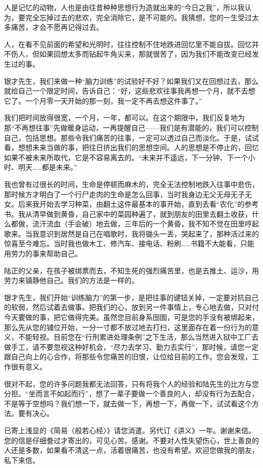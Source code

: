 \par {}
\par 人是记忆的动物，人也是由往昔种种思想行为造就出来的“今日之我”，所以我认为，要完全忘掉过去的悲欢，完全消除它，是不可能的。我猜想，您的一生受过太多痛苦，才会不愿再记得过去。
\par 人，在看不见前面的希望和光明时，往往控制不住地跌进回忆里不能自拔。回忆并不伤人，但如果回想太多而钻起牛角尖来，那就很苦了，因为我们不能改变已经发生过的事。
\par 银才先生，我们来做一种“脑力训练”的试验好不好？如果我们又在回想过去，那么就给自己一个限定时间，告诉自己：“好，这些悲欢往事我再想一个月，就不去想它了。一个月零一天开始的那一刻，我一定不再去想这件事了。”
\par 我们把时间放得很宽，一个月，一年，都可以。在这个期限中，我们反复地为那“不再想往事”先做暖身运动，一再提醒自己——我们是有潜能的，我们可以控制自己，包括思想。那些令我们痛苦的往事，一定可以透过自己而淡化。于是，试试看，想想未来当做的事，把往日挤出我们的思想空间。人的思想是不停止的，回忆如果不被未来所取代，它是不容易离去的。“未来并不遥远，下一分钟、下一个小时、明天……都是未来。”
\par 我也曾有过很长的时间，生命是停顿而麻木的，完全无法控制地跌入往事中悲伤，那时候方才明白了一个行尸走肉的生命是怎么回事，当时我身边无父无母无子无女。后来我开始去学习种菜，由翻土这件最基本的事开始，直到去看“农化”的参考书。我从清早做到黄昏，自己家中的菜园种遍了，就到朋友的田里去翻土收获，什么都做，流汗流血（手会破）地去做，三年后的一个黄昏，我不知不觉在田里哼起歌来。当我意识到居然是自己在唱歌时，我将锄头一丢，哭起来了，那种活过来的惊喜至今难忘。当时我也做木工、修汽车、接电话、粉刷……书籍不大能看，只能用劳力的事来帮助自己。
\par 陆正的父亲，在孩子被绑票而去，不知生死的强烈痛苦里，也是去推土、运沙，用劳力来镇静他自己。我们的方法是一样的。
\par 银才先生，我们开始“训练脑力”的第一步，是把往事的键钮关掉，一定要对抗自己的软弱，然后试着去做事。把我们的心，放到另一件事情上，专心地去做，只对付今天要做的事，把它做得完美。虽然您目前身系囹圄，可是您的手没有被绑起来，那么先从您的铺位开始，一分一寸都不放过地去打扫，这里面存在着一份行为的意义，不能轻视。目前您在“行刑累进处理条例”之下生活，那么当然进入狱中工厂去做手工，请不要忽视这种好机会，“尽力去学习、勤力去实行”，那时候，请您一定跟自己向上的心合作，将那些令您痛苦的旧恨，让位给目前的工作。您会发现，工作很有意义。
\par 很对不起，您的许多问题我都无法回答，只有将我个人的经验和陆先生的比方与您分担。“坐而言不如起而行”，想了一辈子要做一个善良的人，却没有行为去配合，不是等于空想吗？我们想一下，就去做一下，再想一下，再做一下，试试看这个方法。要有决心。
\par 已寄上浅显的《简易〈般若心经〉》请您消遣。另代订《讲义》一年。谢谢来信。您的信是仔细誊过才寄出的，可见心苦。感谢。不要对人性失望伤心，世上善良的人还是多数，如果看不清这一点，活着很痛苦，也没有希望。欢迎您做我的朋友，私下来信。
\par {}




